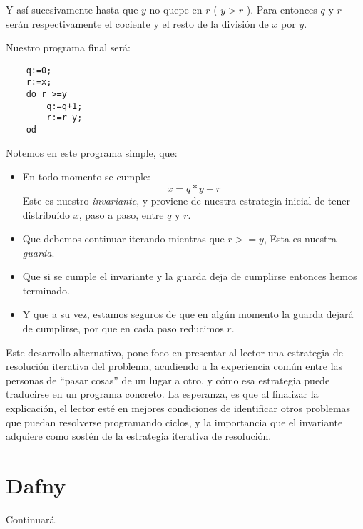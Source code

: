 \documentclass[12pt, a4paper, openany, fleqn]{book}
\begin{document}
    Y así sucesivamente hasta que $y$ no quepe en $r$ ( $ y > r $ ). Para entonces $q$ y $r$ serán respectivamente el cociente y el resto de la división de $x$ por $y$.

    Nuestro programa final será:
    \begin{verbatim}
    q:=0;
    r:=x;
    do r >=y
        q:=q+1;
        r:=r-y;
    od
    \end{verbatim}
    Notemos en este programa simple, que:
    \begin{itemize}
        \item En todo momento se cumple:
        $$x = q * y + r$$
        Este es nuestro \textit{invariante}, y proviene de nuestra estrategia inicial de tener distribuído $x$, paso a paso, entre $q$ y $r$.
        \item Que debemos continuar iterando mientras que $r >= y$,
        Esta es nuestra \textit{guarda}.
        \item Que si se cumple el invariante y la guarda deja de cumplirse entonces hemos terminado.
        \item Y que a su vez, estamos seguros de que en algún momento la guarda dejará de cumplirse, por que en cada paso reducimos $r$.
    \end{itemize}

    Este desarrollo alternativo, pone foco en presentar al lector una estrategia de resolución iterativa del problema, acudiendo a la experiencia común entre las personas de ``pasar cosas'' de un lugar a otro, y cómo esa estrategia puede traducirse en un programa concreto.
    La esperanza, es que al finalizar la explicación, el lector esté en mejores condiciones de identificar otros problemas que puedan resolverse programando ciclos, y la importancia que el invariante adquiere como sostén de la estrategia iterativa de resolución.
    \chapter{Dafny}
    Continuará.
\end{document}
